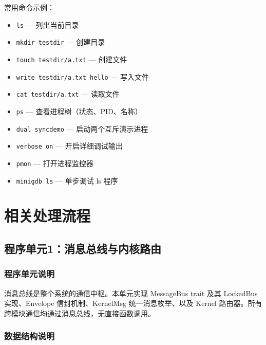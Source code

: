 \documentclass[UTF8,a4paper,12pt]{ctexart}
\begin{document}
常用命令示例：

\begin{itemize}
    \item \texttt{ls} — 列出当前目录
    \item \texttt{mkdir testdir} — 创建目录
    \item \texttt{touch testdir/a.txt} — 创建文件
    \item \texttt{write testdir/a.txt hello} — 写入文件
    \item \texttt{cat testdir/a.txt} — 读取文件
    \item \texttt{ps} — 查看进程树（状态、PID、名称）
    \item \texttt{dual syncdemo} — 启动两个互斥演示进程
    \item \texttt{verbose on} — 开启详细调试输出
    \item \texttt{pmon} — 打开进程监控器
    \item \texttt{minigdb ls} — 单步调试 ls 程序
\end{itemize}

\newpage


\section{相关处理流程}

\subsection{程序单元1：消息总线与内核路由}

\subsubsection{程序单元说明}

消息总线是整个系统的通信中枢。本单元实现 MessageBus trait 及其 LockedBus 实现、Envelope 信封机制、KernelMsg 统一消息枚举、以及 Kernel 路由器。所有跨模块通信均通过消息总线，无直接函数调用。

\subsubsection{数据结构说明}
\end{document}
